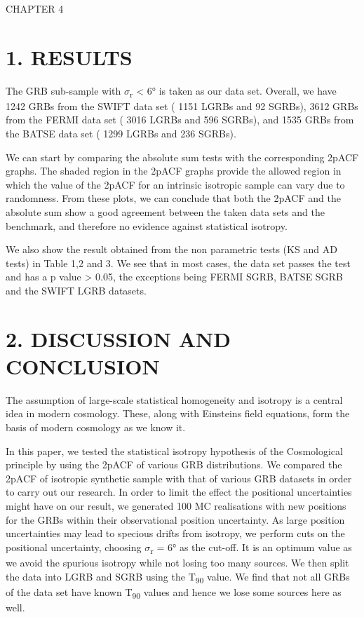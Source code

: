 \documentclass[12pt]{article}
\begin{document}
\clearpage
\newpage
{\huge CHAPTER 4}
\section{1. RESULTS}


The GRB sub-sample with \(\sigma\)\textsubscript{­r­­} \textless{} 6° is
taken as our data set. Overall, we have 1242 GRBs from the SWIFT data set
( 1151 LGRBs and 92 SGRBs), 3612 GRBs from the FERMI data set ( 3016 LGRBs
and 596 SGRBs), and 1535 GRBs from the BATSE data set ( 1299 LGRBs and 236 SGRBs).

We can start by comparing the absolute sum tests with the corresponding 2pACF graphs. The shaded
region in the 2pACF graphs provide the allowed region in which the value
of the 2pACF for an intrinsic isotropic sample can vary due to
randomness. From these plots, we can conclude that both the 2pACF and
the absolute sum show a good agreement between the taken data sets and
the benchmark, and therefore no evidence against statistical isotropy.

We also show the result obtained from the non parametric tests (KS and
AD tests) in Table 1,2 and 3. We see that in most cases, the data set
passes the test and has a p value \textgreater{} 0.05, the exceptions
being FERMI SGRB, BATSE SGRB and the SWIFT LGRB datasets.


\section{2. DISCUSSION AND CONCLUSION}


The assumption of large-scale statistical homogeneity and isotropy is a
central idea in modern cosmology. These, along with
Einstein\textquotesingle s field equations, form the basis of modern
cosmology as we know it.

In this paper, we tested the statistical isotropy hypothesis of the
Cosmological principle by using the 2pACF of various GRB distributions.
We compared the 2pACF of isotropic synthetic sample with that of various
GRB datasets in order to carry out our research. In order to limit the
effect the positional uncertainties might have on our result, we
generated 100 MC realisations with new positions for the GRBs within
their observational position uncertainty. As large position
uncertainties may lead to specious drifts from isotropy, we perform cuts
on the positional uncertainty, choosing \(\sigma\)\textsubscript{­r­­} = 6°
as the cut-off. It is an optimum value as we avoid the spurious isotropy
while not losing too many sources. We then split the data into LGRB and
SGRB using the T­\textsubscript{90} value. We find that not all GRBs of
the data set have known T­\textsubscript{90} values and hence we lose
some sources here as well.
\end{document}

